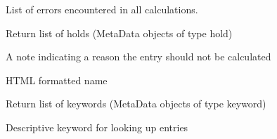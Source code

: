 \documentclass[letterpaper,10pt,english]{sphinxmanual}
\begin{document}
\begin{fulllineitems}
\begin{fulllineitems}
\end{fulllineitems}


\begin{fulllineitems}
\label{models:qmpy.Entry.errors}
List of errors encountered in all calculations.

\end{fulllineitems}


\begin{fulllineitems}
\label{models:qmpy.Entry.hold_objects}
Return list of holds (MetaData objects of type hold)

\end{fulllineitems}


\begin{fulllineitems}
\label{models:qmpy.Entry.holds}
A note indicating a reason the entry should not be calculated

\end{fulllineitems}


\begin{fulllineitems}
\label{models:qmpy.Entry.html}
HTML formatted name

\end{fulllineitems}


\begin{fulllineitems}
\label{models:qmpy.Entry.keyword_objects}
Return list of keywords (MetaData objects of type keyword)

\end{fulllineitems}


\begin{fulllineitems}
\label{models:qmpy.Entry.keywords}
Descriptive keyword for looking up entries

\end{fulllineitems}



\end{fulllineitems}
\end{document}
